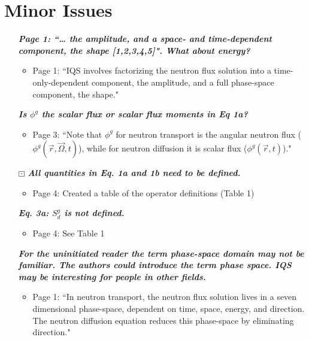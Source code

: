 \documentclass{elsarticle}
\newcommand{\working}{$\boxdot$}
\newcommand{\done}{\checkmark}
\newcommand{\easy}[1]{\textbf{\textit{#1}}}
\begin{document}
\section*{Minor Issues}

\begin{itemize}

\item[\done] \easy{ Page 1: ``… the amplitude, and a space- and time-dependent component, the shape [1,2,3,4,5]". What about energy? }
\begin{itemize}
\item Page 1: ``IQS involves factorizing the neutron flux solution into a time-only-dependent component, the amplitude, and a full phase-space component, the shape."
\end{itemize}

\item[\done] \easy{ Is $\phi^g$ the scalar flux or scalar flux moments in Eq 1a? }
\begin{itemize}
\item Page 3: ``Note that $\phi^g$ for neutron transport is the angular neutron flux ($\phi^g(\vec r, \vec\Omega, t)$), while for neutron diffusion it is scalar flux ($\phi^g(\vec r, t)$)."
\end{itemize}

\item[\working] \easy{ All quantities in Eq. 1a and 1b need to be defined. }
\begin{itemize}
\item Page 4: Created a table of the operator definitions (Table 1)
\end{itemize}

\item[\done] \easy{ Eq. 3a: $S_d^g$ is not defined. }
\begin{itemize}
\item Page 4: See Table 1
\end{itemize}

\item[\done] \easy{ For the uninitiated reader the term phase-space domain may not be familiar. The authors could introduce the term phase space. IQS may be interesting for people in other fields. }
\begin{itemize}
\item Page 1: ``In neutron transport, the neutron flux solution lives in a seven dimensional phase-space, dependent on time, space, energy, and direction. The neutron diffusion equation reduces this phase-space by eliminating direction."
\end{itemize}


\end{itemize}
\end{document}
